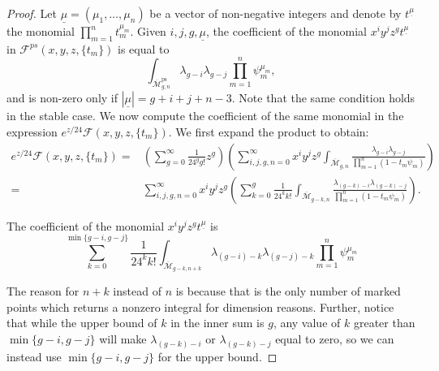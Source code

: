 \documentclass[leqno,12pt]{amsart}
\theoremstyle{remark}
\numberwithin{equation}{section}
\DeclareMathOperator{\ps}{ps}
\begin{document}
\begin{proof}
Let $\underline{\mu} = (\mu_1, \ldots, \mu_n)$ be a vector of non-negative integers and denote by $t^{\underline{\mu}}$ the monomial $\prod_{m = 1}^n t_m^{\mu_m}$.
Given  $i, j, g, \underline{\mu}$, the coefficient of the monomial $x^iy^jz^g t^{\underline{\mu}}$ in $\mathcal{F}^{ps}(x, y, z, \{t_m\})$ is equal to
\begin{equation}\label{Eq:firstside}
\int_{\overline{\mathcal{M}}^{\ps}_{g, n}} \lambda_{g-i}\lambda_{g-j}\prod_{m = 1}^n \psi_m^{\mu_m},
\end{equation}
and is non-zero only if $|\underline{\mu}| = g + i + j + n - 3$. Note that the same condition holds in the stable case. 
We now compute the coefficient of the same monomial in the 
expression $e^{z/24}\mathcal{F}(x, y, z, \{t_m\})$. We first expand the product to obtain:
    \begin{align*}
        e^{z/24}\mathcal{F}(x, y, z, \{t_m\})
        = &\left(\sum_{g = 0}^\infty\frac{1}{24^gg!}z^g\right)\left(\sum_{i, j, g, n = 0}^\infty x^iy^jz^g \int_{\overline{\mathcal{M}}_{g, n}} \frac{\lambda_{g-i}\lambda_{g-j}}{\prod_{m=1}^n (1 - t_m\psi_m)}\right)\\
        = &\sum_{i, j, g, n=0}^\infty x^iy^jz^g\left(\sum_{k=0}^g \frac{1}{24^kk!}\int_{\overline{\mathcal{M}}_{g-k, n}} \frac{\lambda_{(g-k)-i}\lambda_{(g-k)-j}}{\prod_{m=1}^n (1 - t_m\psi_m)}\right).
    \end{align*}

The coefficient of the monomial $x^iy^jz^g t^{\underline{\mu}}$ is 
\begin{equation}\label{eq:otherside}
\sum_{k=0}^{\min\{g-i, g-j\}} \frac{1}{24^kk!}\int_{\overline{\mathcal{M}}_{g-k, n+k}} {\lambda_{(g-i)-k}\lambda_{(g-j)-k}}\prod_{m = 1}^n \psi_m^{\mu_m}
\end{equation}
    
    The reason for $n+k$ instead of $n$ is because that is the only number of marked points which  returns a nonzero integral for dimension reasons. Further, notice that while the upper bound of $k$ in the inner sum is $g$, any value of $k$ greater than $\min\{g-i, g-j\}$ will make $\lambda_{(g-k)-i}$ or $\lambda_{(g-k)-j}$ equal to zero, so we can instead use $\min\{g-i, g-j\}$ for the upper bound.
   

\end{proof}
\end{document}
